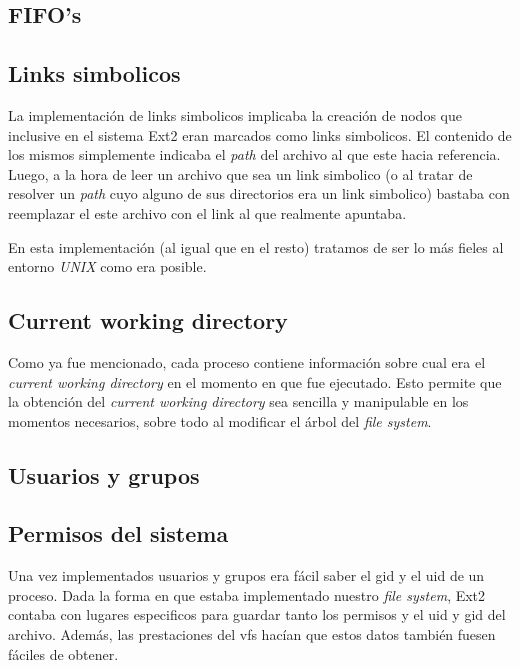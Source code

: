 \documentclass[a4paper,10pt]{article}
\begin{document}
    \subsection{FIFO's}

    \subsection{Links simbolicos}
    
    La implementación de links simbolicos implicaba la creación de nodos que inclusive en el sistema Ext2 eran marcados
    como links simbolicos. El contenido de los mismos simplemente indicaba el \textit{path} del archivo al que este
    hacia referencia.
    Luego, a la hora de leer un archivo que sea un link simbolico (o al tratar de resolver un \textit{path} cuyo alguno
    de sus directorios era un link simbolico) bastaba con reemplazar el este archivo con el link al que realmente
    apuntaba.

    En esta implementación (al igual que en el resto) tratamos de ser lo más fieles al entorno \textit{UNIX} como 
    era posible.

    \subsection{Current working directory}
        
    Como ya fue mencionado, cada proceso contiene información sobre cual era el \textit{current working directory} en
    el momento en que fue ejecutado. Esto permite que la obtención del \textit{current working directory} sea sencilla
    y manipulable en los momentos necesarios, sobre todo al modificar el árbol del \textit{file system}.

    \subsection{Usuarios y grupos}
    
    \subsection{Permisos del sistema}

    Una vez implementados usuarios y grupos era fácil saber el gid y el uid de un proceso. Dada la forma en que estaba
    implementado nuestro \textit{file system}, Ext2 contaba con lugares especificos para guardar tanto los permisos y el
    uid y gid del archivo. Además, las prestaciones del vfs hacían que estos datos también fuesen fáciles de obtener.
\end{document}
